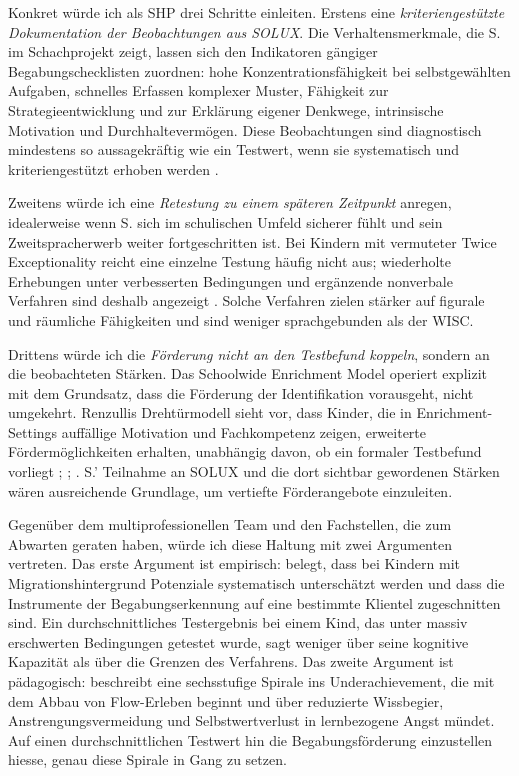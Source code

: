 \documentclass[ngerman, a4paper]{article}
\begin{document}
Konkret würde ich als SHP drei Schritte einleiten. Erstens eine
\textit{kriteriengestützte Dokumentation der Beobachtungen aus SOLUX}. Die
Verhaltensmerkmale, die S. im Schachprojekt zeigt, lassen sich den Indikatoren
gängiger Begabungschecklisten zuordnen: hohe Konzentrationsfähigkeit bei
selbstgewählten Aufgaben, schnelles Erfassen komplexer Muster, Fähigkeit zur
Strategieentwicklung und zur Erklärung eigener Denkwege, intrinsische Motivation
und Durchhaltevermögen. Diese Beobachtungen sind diagnostisch mindestens so
aussagekräftig wie ein Testwert, wenn sie systematisch und kriteriengestützt
erhoben werden \parencite[S.\,34--41]{trautmann2016einfuehrung,muelleroppliger2021paeddiagnostik}.

Zweitens würde ich eine \textit{Retestung zu einem späteren Zeitpunkt} anregen,
idealerweise wenn S. sich im schulischen Umfeld sicherer fühlt und sein
Zweitspracherwerb weiter fortgeschritten ist. Bei Kindern mit vermuteter
Twice Exceptionality reicht eine einzelne Testung häufig nicht aus; wiederholte
Erhebungen unter verbesserten Bedingungen und ergänzende nonverbale Verfahren
sind deshalb angezeigt \parencite[S.\,93,\,169--172]{maehler2018diagnostik}.
Solche Verfahren zielen stärker auf figurale und räumliche Fähigkeiten und sind
weniger sprachgebunden als der WISC.

Drittens würde ich die \textit{Förderung nicht an den Testbefund koppeln}, sondern
an die beobachteten Stärken. Das Schoolwide Enrichment Model operiert explizit mit
dem Grundsatz, dass die Förderung der Identifikation vorausgeht, nicht umgekehrt.
Renzullis Drehtürmodell sieht vor, dass Kinder, die in Enrichment-Settings
auffällige Motivation und Fachkompetenz zeigen, erweiterte Fördermöglichkeiten
erhalten, unabhängig davon, ob ein formaler Testbefund vorliegt
\parencite{muelleroppliger2021handbuch};
\parencite[S.\,104--105]{hoyer2013begabung};
\parencite[S.\,254--273]{fischer2020begabungsfoerderung}. S.'
Teilnahme an SOLUX und die dort sichtbar gewordenen Stärken wären ausreichende
Grundlage, um vertiefte Förderangebote einzuleiten.

Gegenüber dem multiprofessionellen Team und den Fachstellen, die zum Abwarten
geraten haben, würde ich diese Haltung mit zwei Argumenten vertreten. Das erste
Argument ist empirisch: \textcite[S.\,576--585]{stamm2021fehlenderblick} belegt, dass bei Kindern mit Migrationshintergrund
Potenziale systematisch unterschätzt werden und dass die Instrumente der
Begabungserkennung auf eine bestimmte Klientel zugeschnitten sind. Ein
durchschnittliches Testergebnis bei einem Kind, das unter massiv erschwerten
Bedingungen getestet wurde, sagt weniger über seine kognitive Kapazität als über
die Grenzen des Verfahrens. Das zweite Argument
ist pädagogisch: \textcite[S.\,70--72]{lehwald2017motivation} beschreibt
eine sechsstufige Spirale ins Underachievement, die mit dem Abbau von
Flow-Erleben beginnt und über reduzierte Wissbegier, Anstrengungsvermeidung
und Selbstwertverlust in lernbezogene Angst mündet. Auf einen
durchschnittlichen Testwert hin die Begabungsförderung einzustellen hiesse,
genau diese Spirale in Gang zu setzen.
\end{document}
